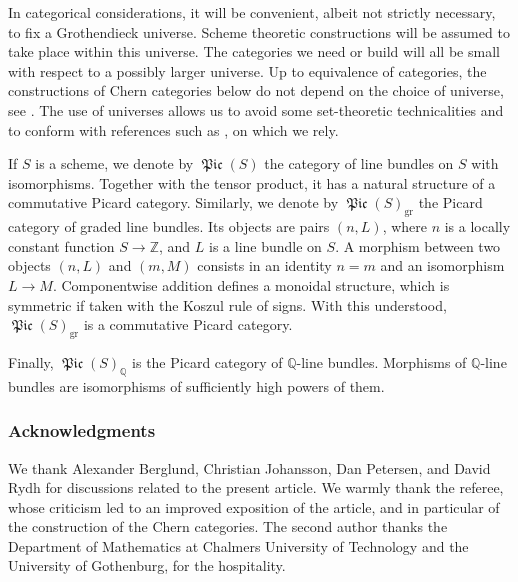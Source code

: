 \documentclass[11pt]{article}
\theoremstyle{plain}
\theoremstyle{definition}
\newcommand{\QBbb}{\mathbb Q}
\newcommand{\ZBbb}{\mathbb Z}
\DeclareMathOperator{\Picfr}{\mathfrak{Pic}}
\begin{document}
In categorical considerations, it will be convenient, albeit not strictly necessary, to fix a Grothendieck universe. Scheme theoretic constructions will be assumed to take place within this universe. The categories we need or build will all be small with respect to a possibly larger universe. Up to equivalence of categories, the constructions of Chern categories below do not depend on the choice of universe, see \cite[App.\,F]{ThomasonTrobaugh}. The use of universes allows us to avoid some set-theoretic technicalities and to conform with references such as \cite{ThomasonTrobaugh}, on which we rely.

If $S$ is a scheme, we denote by $\Picfr(S)$ the category of line bundles on $S$ with isomorphisms. Together with the tensor product, it has a natural structure of a commutative Picard category. Similarly, we denote by $\Picfr(S)_{\mathrm{gr}}$ the Picard category of graded line bundles. Its objects are pairs $(n,L)$, where $n$ is a locally constant function $S\to\ZBbb$, and $L$ is a line bundle on $S$. A morphism between two objects $(n,L)$ and $(m,M)$ consists in an identity $n=m$ and an isomorphism $L\to M$. Componentwise addition defines a monoidal structure, which is symmetric if taken with the Koszul rule of signs. With this understood, $\Picfr(S)_{\mathrm{gr}}$ is a commutative Picard category.

Finally, $\Picfr(S)_{\QBbb}$ is the Picard category of $\QBbb$-line bundles. Morphisms of $\QBbb$-line bundles are isomorphisms of sufficiently high powers of them.

\subsubsection*{Acknowledgments}
We thank Alexander Berglund, Christian Johansson, Dan Petersen, and David Rydh for discussions related to the present article. We warmly thank the referee, whose criticism led to an improved exposition of the article, and in particular of the construction of the Chern categories. The second author thanks the Department of Mathematics at Chalmers University of Technology and the University of Gothenburg, for the hospitality.
\end{document}
